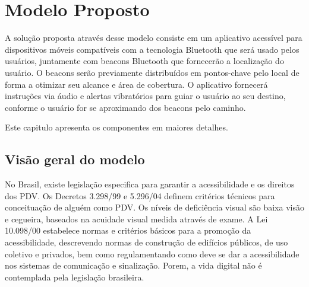\documentclass[english,brazilian]{UNISINOSmonografia}
\begin{document}
\chapter{Modelo Proposto}

A solução proposta através desse modelo consiste em um aplicativo acessível para dispositivos móveis compatíveis com a tecnologia Bluetooth que será usado pelos usuários, juntamente com beacons Bluetooth que fornecerão a localização do usuário. O beacons serão previamente distribuídos em pontos-chave pelo local de forma a otimizar seu alcance e área de cobertura. O aplicativo fornecerá instruções via áudio e alertas vibratórios para guiar o usuário ao seu destino, conforme o usuário for se aproximando dos beacons pelo caminho.

Este capitulo apresenta os componentes em maiores detalhes.

\section{Visão geral do modelo}





No Brasil, existe legislação especifica para garantir a acessibilidade e os direitos dos PDV. Os Decretos 3.298/99 e 5.296/04 definem critérios técnicos para conceituação de alguém como PDV. Os níveis de deficiência visual são baixa visão e cegueira, baseados na acuidade visual medida através de exame. A Lei 10.098/00 estabelece normas e critérios básicos para a promoção da acessibilidade, descrevendo normas de construção de edifícios públicos, de uso coletivo e privados, bem como regulamentando como deve se dar a acessibilidade nos sistemas de comunicação e sinalização. Porem, a vida digital não é contemplada pela legislação brasileira.
\end{document}
